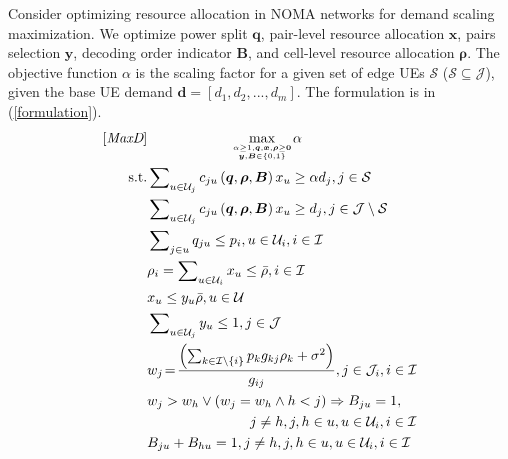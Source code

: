 \documentclass[10pt,journal,final,finalsubmission,twocolumn]{IEEEtran}
\begin{document}
Consider optimizing resource allocation in NOMA networks for demand scaling maximization. We optimize power split $\boldsymbol{q}$, pair-level resource allocation $\boldsymbol{x}$, pairs selection $\boldsymbol{y}$, decoding order indicator $\boldsymbol{B}$, and cell-level resource allocation $\boldsymbol{\rho}$. The objective function $\alpha$ is the scaling factor for a given set of edge UEs $\mathcal{S}$ ($\mathcal{S}\subseteq \mathcal{J}$), given the base UE demand $\boldsymbol{d}=[d_1,d_2,...,d_m]$. The formulation is in (\ref {formulation}).
\begin{subequations}\label{formulation}
\begin{align}
\textup{[{\em MaxD}]}&\ \ \ \ \ \ \ \ \ \ \ \ \ \ \ \ \ \ \underset{\alpha \geq 1,\boldsymbol{q},\boldsymbol{x},\boldsymbol{\rho}\geq \boldsymbol{0} \atop \boldsymbol{y},\boldsymbol{B}\in \left \{ 0,1 \right \}}{\max} \alpha  \\
\textup{ s.t.}& \sum\nolimits_{u\in {\mathcal{U}}_j} c_{ju}\left (\boldsymbol{q},\boldsymbol{ \rho}, \boldsymbol{B}\right )x_u\geq \alpha d_j, j\in \mathcal{S}\label{demand1}\\ 
& \sum\nolimits_{u\in {\mathcal{U}}_j} c_{ju}\left (\boldsymbol{q},\boldsymbol{ \rho}, \boldsymbol{B}\right )x_u\geq  d_j, j\in \mathcal{J} \setminus  \mathcal{S}\label{demand2}\\ 
&\sum \nolimits_{j \in u} q_{ju}\leq p_i,u\in {\mathcal{U}}_i, i\in \mathcal{I}  \label{limit1}\\
&\rho _i =\sum \nolimits_{u\in {\mathcal{U}}_i}x_u\leq \bar{\rho}, i\in \mathcal{I} \label{limit2}\\
&x_u\leq y_u \bar{\rho}, u\in \mathcal{U}\label{y1}\\
&\sum\nolimits_{u\in \mathcal{U}_j}y_u\leq1,j\in\mathcal{J}\label{y2}\\
&w_j\!=\!  \frac{\left(\sum \nolimits_{k \in \mathcal{I}\setminus \left \{ i \right \} }p_k g_{kj}\rho_k+\sigma ^2   \right)}{ g_{ij}},j \in \mathcal{J}_i ,i\in \mathcal{I}\label{order0}\\
&w_j>w_h\vee(w_j=w_h\wedge h < j)\Rightarrow B_{ju}=1,\notag\\
&\ \ \ \ \ \ \ \ \ \ \ \ \ \ \ \ \ \ \ \ \ \ j\neq h,j,h\in u, u\in \mathcal{U}_i, i\in \mathcal{I}\label{order1}\\
&B_{ju}+B_{hu}=1, j\neq h, j,h\in u, u\in \mathcal{U}_i, i\in \mathcal{I}\label{order2}
\end{align}
\end{subequations}
\end{document}
